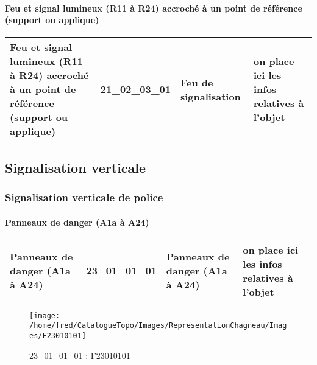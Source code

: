 \documentclass[12pt,titlepage,oneside]{book}
\begin{document}
\paragraph{Feu et signal lumineux (R11 à R24) accroché à un point de référence (support ou applique)}
\noindent
\vspace{\baselineskip}

\renewcommand{\arraystretch}{1.2}
\begin{supertabular}{|p{10cm}|c|p{13cm}|p{12cm}|}
 Feu et signal lumineux (R11 à R24) accroché à un point de référence (support ou applique) & 21\_02\_03\_01 & Feu de signalisation & on place ici les infos relatives à l'objet\\
\hline
\end{supertabular}
\begin{figure}[h!]
  \hfill         %
\end{figure}
\subsection{Signalisation verticale}
\subsubsection{\large Signalisation verticale de police}
\paragraph{Panneaux de danger (A1a à A24)}
\noindent
\vspace{\baselineskip}

\renewcommand{\arraystretch}{1.2}
\begin{supertabular}{|p{10cm}|c|p{13cm}|p{12cm}|}
 Panneaux de danger (A1a à A24) & 23\_01\_01\_01 & Panneaux de danger (A1a à A24) & on place ici les infos relatives à l'objet\\
\hline
\end{supertabular}
\begin{figure}[h!]
  \hfill         %
  \begin{minipage}[t]{3cm}
    \begin{center}
      \texttt{[image: /home/fred/CatalogueTopo/Images/RepresentationChagneau/Images/F23010101]}
      \caption[F23010101]{\label{} 23\_01\_01\_01 : F23010101}
    \end{center}
  \end{minipage}
\end{figure}
\end{document}
